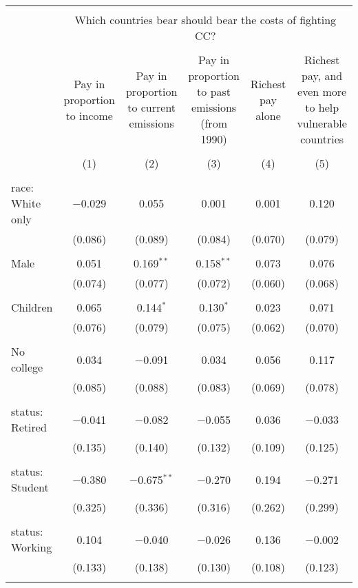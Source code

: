 
\begin{tabular}{@{\extracolsep{5pt}}lccccc} 
\\[-1.8ex]\hline 
\hline \\[-1.8ex] 
 & \multicolumn{5}{c}{Which countries bear should bear the costs of fighting CC?} \\ 
\cline{2-6} 
\\[-1.8ex] & Pay in proportion to income & Pay in proportion to current emissions & Pay in proportion to past emissions (from 1990) & Richest pay alone & Richest pay, and even more to help vulnerable countries \\ 
\\[-1.8ex] & (1) & (2) & (3) & (4) & (5)\\ 
\hline \\[-1.8ex] 
 race: White only & $-$0.029 & 0.055 & 0.001 & 0.001 & 0.120 \\ 
  & (0.086) & (0.089) & (0.084) & (0.070) & (0.079) \\ 
  & & & & & \\ 
 Male & 0.051 & 0.169$^{**}$ & 0.158$^{**}$ & 0.073 & 0.076 \\ 
  & (0.074) & (0.077) & (0.072) & (0.060) & (0.068) \\ 
  & & & & & \\ 
 Children & 0.065 & 0.144$^{*}$ & 0.130$^{*}$ & 0.023 & 0.071 \\ 
  & (0.076) & (0.079) & (0.075) & (0.062) & (0.070) \\ 
  & & & & & \\ 
 No college & 0.034 & $-$0.091 & 0.034 & 0.056 & 0.117 \\ 
  & (0.085) & (0.088) & (0.083) & (0.069) & (0.078) \\ 
  & & & & & \\ 
 status: Retired & $-$0.041 & $-$0.082 & $-$0.055 & 0.036 & $-$0.033 \\ 
  & (0.135) & (0.140) & (0.132) & (0.109) & (0.125) \\ 
  & & & & & \\ 
 status: Student & $-$0.380 & $-$0.675$^{**}$ & $-$0.270 & 0.194 & $-$0.271 \\ 
  & (0.325) & (0.336) & (0.316) & (0.262) & (0.299) \\ 
  & & & & & \\ 
 status: Working & 0.104 & $-$0.040 & $-$0.026 & 0.136 & $-$0.002 \\ 
  & (0.133) & (0.138) & (0.130) & (0.108) & (0.123) \\ 
  & & & & & \\ 

\end{tabular}
